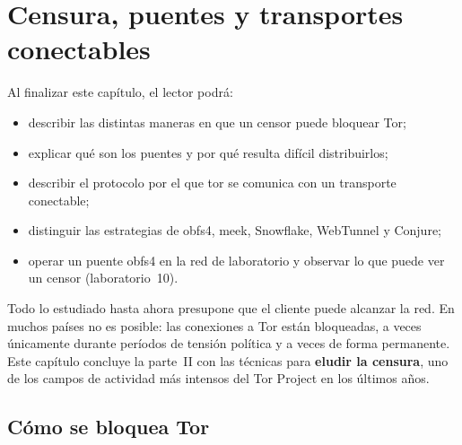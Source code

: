\chapter{Censura, puentes y transportes conectables}\label{cap:16-censura}

\begin{obiettivi}
Al finalizar este capítulo, el lector podrá:
\begin{itemize}[nosep]
  \item describir las distintas maneras en que un censor puede bloquear Tor;
  \item explicar qué son los puentes y por qué resulta difícil distribuirlos;
  \item describir el protocolo por el que tor se comunica con un transporte conectable;
  \item distinguir las estrategias de obfs4, meek, Snowflake, WebTunnel y Conjure;
  \item operar un puente obfs4 en la red de laboratorio y observar lo que puede ver un censor (laboratorio~10).
\end{itemize}
\end{obiettivi}

Todo lo estudiado hasta ahora presupone que el cliente puede alcanzar la red. En muchos países no es posible: las conexiones a Tor están bloqueadas, a veces únicamente durante períodos de tensión política y a veces de forma permanente. Este capítulo concluye la parte~II con las técnicas para \textbf{eludir la censura}, uno de los campos de actividad más intensos del Tor Project en los últimos años.

\section{Cómo se bloquea Tor}\label{sec:cens-blocco}

